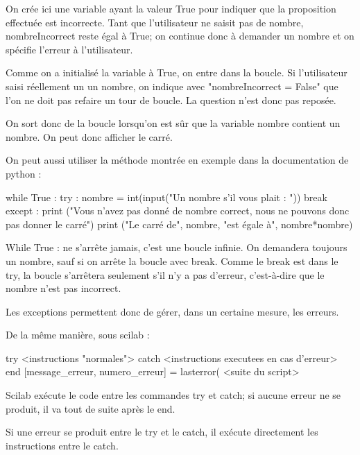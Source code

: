 \documentclass[10pt,fleqn]{article} %
\begin{document}
On crée ici une variable ayant la valeur \textsf{True} pour indiquer que la proposition effectuée est incorrecte. Tant que l'utilisateur ne saisit pas de nombre, nombreIncorrect reste égal à \textsf{True}; on continue donc à demander un nombre et on spécifie l'erreur à l'utilisateur.

Comme on a initialisé la variable à \textsf{True}, on entre dans la boucle. Si l'utilisateur saisi réellement un un nombre, on indique avec \textsf{"nombreIncorrect = False"} que l'on ne doit pas refaire un tour de boucle. La question n'est donc pas reposée. 

On sort donc de la boucle lorsqu'on est sûr que la variable nombre contient un nombre. On peut donc afficher le carré.

On peut aussi utiliser la méthode montrée en exemple dans la documentation de python : 
\begin{py}
\begin{python}
while True :
    try :
        nombre = int(input("Un nombre s'il vous plait : "))
        break
    except :
        print ("Vous n'avez pas donné de nombre correct, nous ne pouvons donc pas donner le carré")
print ("Le carré de", nombre, "est égale à", nombre*nombre)
\end{python}
\end{py}

\textsf{While True :} ne s'arrête jamais, c'est une boucle infinie. On demandera toujours un nombre, sauf si on arrête la boucle avec \textsf{break}. Comme le \textsf{break} est dans le \textsf{try}, la boucle s'arrêtera seulement s'il n'y a pas d'erreur, c'est-à-dire que le nombre n'est pas incorrect.
	
Les exceptions permettent donc de gérer, dans un certaine mesure, les erreurs.

De la même manière, sous scilab :
\begin{sci}
\begin{scilab}
try
	<instructions "normales">
catch
	<instructions executees en cas d'erreur>
end
[message_erreur, numero_erreur] = lasterror(%
<suite du script>
\end{scilab}
\end{sci}

Scilab exécute le code entre les commandes \textsf{try} et \textsf{catch}; si aucune erreur ne se produit, il va tout de suite après le \textsf{end}.

Si une erreur se produit entre le \textsf{try} et le \textsf{catch}, il exécute directement les instructions entre le \textsf{catch}.
\end{document}
